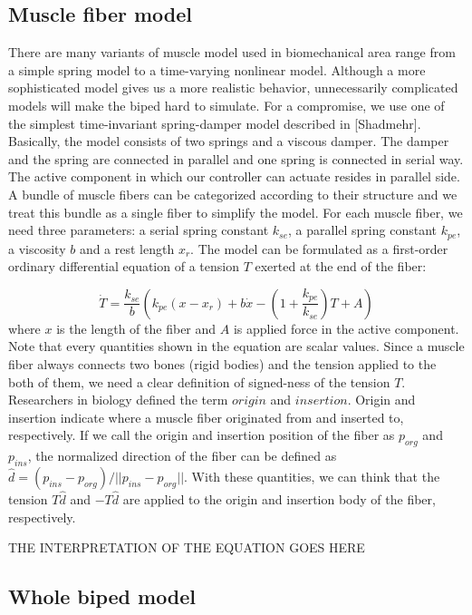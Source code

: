 \documentclass[a4paper,10pt]{article}
\begin{document}
\subsection{Muscle fiber model}

There are many variants of muscle model used in biomechanical area range
from a simple spring model to a time-varying nonlinear model. Although
a more sophisticated model gives us a more realistic behavior, unnecessarily
complicated models will make the biped hard to simulate. For a compromise,
we use one of the simplest time-invariant spring-damper model described in [Shadmehr].
Basically, the model consists of two springs and a viscous damper.
The damper and the spring are connected in parallel and one spring is
connected in serial way. The active component in which our controller
can actuate resides in parallel side. A bundle of muscle fibers can be
categorized according to their structure and we treat this bundle as
a single fiber to simplify the model. For each muscle fiber, we need three
parameters: a serial spring constant $k_{se}$, a parallel spring constant $k_{pe}$,
a viscosity $b$ and a rest length $x_{r}$. The model can be formulated
as a first-order ordinary differential equation of a tension $T$ exerted
at the end of the fiber:

\begin{equation}\label{muscle-ode}
\dot{T} = \frac{k_{se}}{b} \left( k_{pe}(x-x_{r})+b\dot{x}-\left(1+\frac{k_{pe}}{k_{se}}\right)T+A   \right)
\end{equation}
where $x$ is the length of the fiber and $A$ is applied force in the active
component. Note that every quantities shown in the equation are scalar values.
Since a muscle fiber always connects two bones (rigid bodies) and the
tension applied to the both of them, we need a clear definition of signed-ness
of the tension $T$. Researchers in biology defined the term $origin$ and $insertion$.
Origin and insertion indicate where a muscle fiber originated from and inserted
to, respectively. If we call the origin and insertion position of the fiber
as $p_{org}$ and $p_{ins}$, the normalized direction of the fiber can be
defined as $\hat{d}=(p_{ins}-p_{org})/||p_{ins}-p_{org}||$. With these quantities, we can think that
the tension $T\hat{d}$ and $-T\hat{d}$ are applied to the origin and insertion body
of the fiber, respectively.

THE INTERPRETATION OF THE EQUATION GOES HERE

\subsection{Whole biped model}
\end{document}
